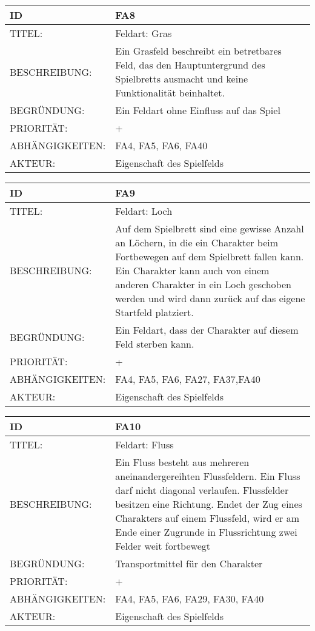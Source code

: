 \documentclass{uulm-assignment}
\begin{document}
    \begin{tabularx}{\textwidth}{|l|X |} \hline
        \textbf{ID} & \textbf{FA8} \\
        \hline
        TITEL: &  Feldart: Gras\\
        \hline
        BESCHREIBUNG: & Ein Grasfeld beschreibt ein betretbares Feld, das den Hauptuntergrund des Spielbretts ausmacht und keine Funktionalität beinhaltet.
        \\
        \hline
        BEGRÜNDUNG: & Ein Feldart ohne Einfluss auf das Spiel\\
        \hline
        PRIORITÄT: & +\\
        \hline
        ABHÄNGIGKEITEN: & FA4, FA5, FA6, FA40\\
        \hline
        AKTEUR: &  Eigenschaft des Spielfelds\\
        \hline
    \end{tabularx}
    
    \begin{tabularx}{\textwidth}{|l|X |} \hline
        \textbf{ID} & \textbf{FA9} \\
        \hline
        TITEL: &  Feldart: Loch\\
        \hline
        BESCHREIBUNG: & Auf dem Spielbrett sind eine gewisse Anzahl an Löchern, in die ein Charakter beim Fortbewegen auf dem Spielbrett fallen kann. Ein Charakter kann auch von
einem anderen Charakter in ein Loch geschoben werden und wird dann zurück auf das eigene Startfeld platziert.
        \\
        \hline
        BEGRÜNDUNG: & Ein Feldart, dass der Charakter auf diesem Feld sterben kann.\\
        \hline
        PRIORITÄT: & +\\
        \hline
        ABHÄNGIGKEITEN: & FA4, FA5, FA6, FA27, FA37,FA40\\
        \hline
        AKTEUR: & Eigenschaft des Spielfelds\\
        \hline
    \end{tabularx}
    
    \begin{tabularx}{\textwidth}{|l|X |} \hline
        \textbf{ID} & \textbf{FA10} \\
        \hline
        TITEL: &  Feldart: Fluss\\
        \hline
        BESCHREIBUNG: & Ein Fluss besteht aus mehreren aneinandergereihten Flussfeldern. Ein Fluss darf nicht diagonal verlaufen. Flussfelder besitzen eine Richtung. Endet der Zug eines
Charakters auf einem Flussfeld, wird er am Ende einer Zugrunde in Flussrichtung
zwei Felder weit fortbewegt
        \\
        \hline
        BEGRÜNDUNG: & Transportmittel für den Charakter\\
        \hline
        PRIORITÄT: & +\\
        \hline
        ABHÄNGIGKEITEN: & FA4, FA5, FA6, FA29, FA30, FA40\\
        \hline
        AKTEUR: & Eigenschaft des Spielfelds \\
        \hline
    \end{tabularx}
    
\end{document}
